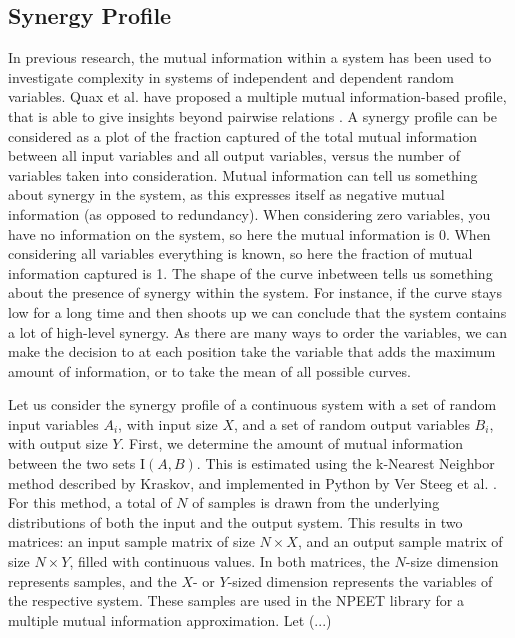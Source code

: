 \documentclass[../main.tex]{subfiles}
\begin{document}
\subsection{Synergy Profile}

In previous research, the mutual information within a system has been used to investigate complexity in systems of independent and dependent random variables.
Quax et al. have proposed a multiple mutual information-based profile, that is able to give insights beyond pairwise relations \cite{quax2017quantifying}.
A synergy profile can be considered as a plot of the fraction captured of the total mutual information between all input variables and all output variables, versus the number of variables taken into consideration.
Mutual information can tell us something about synergy in the system, as this expresses itself as negative mutual information (as opposed to redundancy).
When considering zero variables, you have no information on the system, so here the mutual information is 0.
When considering all variables everything is known, so here the fraction of mutual information captured is 1. 
The shape of the curve inbetween tells us something about the presence of synergy within the system.
For instance, if the curve stays low for a long time and then shoots up we can conclude that the system contains a lot of high-level synergy.
As there are many ways to order the variables, we can make the decision to at each position take the variable that adds the maximum amount of information, or to take the mean of all possible curves.

Let us consider the synergy profile of a continuous system with a set of random input variables $A_i$, with input size $X$, and a set of random output variables $B_i$, with output size $Y$.
First, we determine the amount of mutual information between the two sets $\mathrm{I}(A, B)$.
This is estimated using the k-Nearest Neighbor method described by Kraskov, and implemented in Python by Ver Steeg et al. \cite{kraskov2004estimating, versteeg2013NPEET}.
For this method, a total of $N$ of samples is drawn from the underlying distributions of both the input and the output system.
This results in two matrices: an input sample matrix of size $N \times X$, and an output sample matrix of size $N \times Y$, filled with continuous values.
In both matrices, the $N$-size dimension represents samples, and the $X$- or $Y$-sized dimension represents the variables of the respective system.
These samples are used in the NPEET library for a multiple mutual information approximation.
Let (...)
\end{document}
